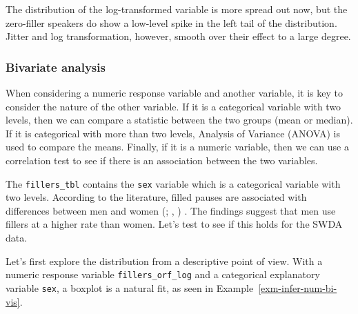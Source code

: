 \documentclass[
  letterpaper,
  krantz1]{latex/krantz-mod}
\theoremstyle{definition}
\theoremstyle{definition}
\theoremstyle{remark}
\begin{document}
The distribution of the log-transformed variable is more spread out now,
but the zero-filler speakers do show a low-level spike in the left tail
of the distribution. Jitter and log transformation, however, smooth over
their effect to a large degree.

\subsubsection{Bivariate analysis}\label{bivariate-analysis}

When considering a numeric response
variable and another variable, it is key to
consider the nature of the other variable. If it is a categorical
variable with two levels, then we can
compare a statistic between the two groups (mean or
median). If it is categorical with more than two
levels, Analysis of Variance (ANOVA)
is used to compare the means. Finally, if it is a numeric
variable, then we can use a correlation test to see
if there is an association between the two variables.

The \texttt{fillers\_tbl} contains the \texttt{sex} variable which is a
categorical variable with two levels. According to the literature,
filled pauses are associated with differences between men and women
(;
,
) . The findings suggest
that men use fillers at a higher rate than women. Let's test to see if
this holds for the SWDA
data.

Let's first explore the distribution from a descriptive point of
view. With a numeric response variable
\texttt{fillers\_orf\_log} and a categorical explanatory variable
\texttt{sex}, a boxplot is a natural fit, as seen in
Example~\ref{exm-infer-num-bi-vis}.

\pagebreak
\end{document}
